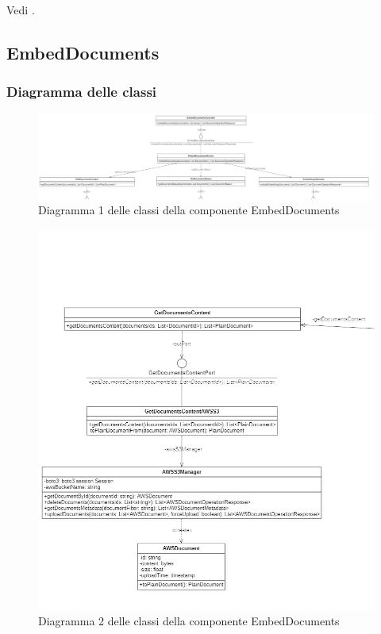 \documentclass[10pt, a4paper]{article}
\begin{document}
Vedi .



\subsection{EmbedDocuments}
\subsubsection{Diagramma delle classi}

\begin{figure}[H]
    \centering        
    \includegraphics[width=16cm]{img/EmbedDocs1.png}
    \caption{Diagramma 1 delle classi della componente EmbedDocuments}
\end{figure}

\begin{figure}[H]
    \centering        
    \includegraphics[scale=0.5]{img/EmbedDocs2.png}
    \caption{Diagramma 2 delle classi della componente EmbedDocuments}
\end{figure}
\end{document}
